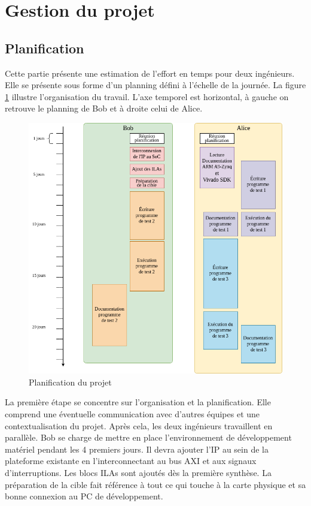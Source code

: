 \section{Gestion du projet}

\subsection{Planification}

Cette partie présente une estimation de l'effort en temps pour deux ingénieurs.
Elle se présente sous forme d'un planning défini à l'échelle de la journée.
La figure \ref{fig:planification} illustre l'organisation du travail.
L'axe temporel est horizontal, à gauche on retrouve le planning de Bob et à droite celui de Alice.

\begin{figure}[H]
	\centering
	\includegraphics[width=0.75\linewidth]{figure/planning_integration.png}
	\caption{Planification du projet}
	\label{fig:planification}
\end{figure}
La première étape se concentre sur l'organisation et la planification.
Elle comprend une éventuelle communication avec d'autres équipes et une contextualisation du projet.
Après cela, les deux ingénieurs travaillent en parallèle.
Bob se charge de mettre en place l'environnement de développement matériel pendant les 4 premiers jours.
Il devra ajouter l'IP au sein de la plateforme existante en l'interconnectant au bus AXI et aux signaux d'interruptions.
Les blocs ILAs sont ajoutés dès la première synthèse.
La préparation de la cible fait référence à tout ce qui touche à la carte physique et sa bonne connexion au PC de développement.
